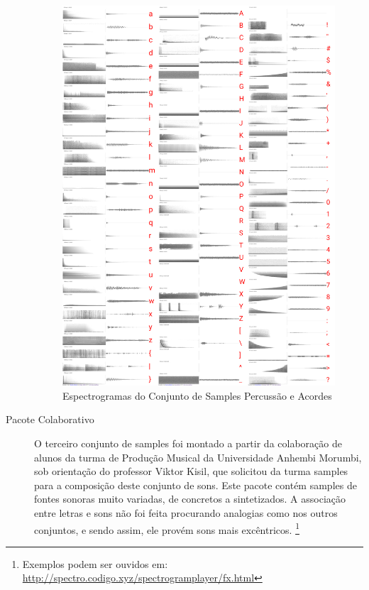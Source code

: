 \begin{description}
\begin{figure}
    \caption{\label{samplespercussao}Espectrogramas do Conjunto de Samples Percussão e Acordes}
    \begin{center}
        \includegraphics[width=1\linewidth]{pictures/cap3/bandapercussao.jpg}
    \end{center}
\end{figure}

\item[Pacote Colaborativo]O terceiro conjunto de samples foi montado a partir da colaboração de alunos da turma de Produção Musical da Universidade Anhembi Morumbi, sob orientação do professor Viktor Kisil, que solicitou da turma samples para a composição deste conjunto de sons. Este pacote contém samples de fontes sonoras muito variadas, de concretos a sintetizados. A associação entre letras e sons não foi feita procurando analogias como nos outros conjuntos, e sendo assim, ele provém sons mais excêntricos. \footnote{Exemplos podem ser ouvidos em: \url{http://spectro.codigo.xyz/spectrogramplayer/fx.html}} 


\end{description}
